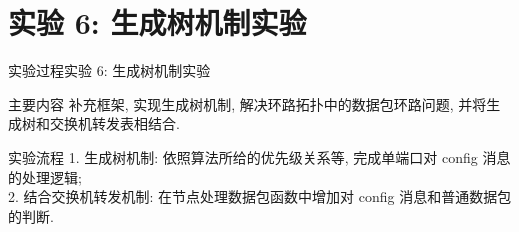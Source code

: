 \documentclass{beamer}
\begin{document}
\section{实验 6: 生成树机制实验}
\begin{frame}
    \sectionpage
\end{frame}

\begin{frame}{实验过程}{实验 6: 生成树机制实验}
    \begin{block}{主要内容}
        补充框架, 实现生成树机制,
        解决环路拓扑中的数据包环路问题,
        并将生成树和交换机转发表相结合.
    \end{block}

    \begin{block}{实验流程}
        1. 生成树机制: 依照算法所给的优先级关系等,
        完成单端口对 config 消息的处理逻辑;\\
        2. 结合交换机转发机制: 在节点处理数据包函数中增加对
        config 消息和普通数据包的判断.
    \end{block}
\end{frame}
\end{document}
